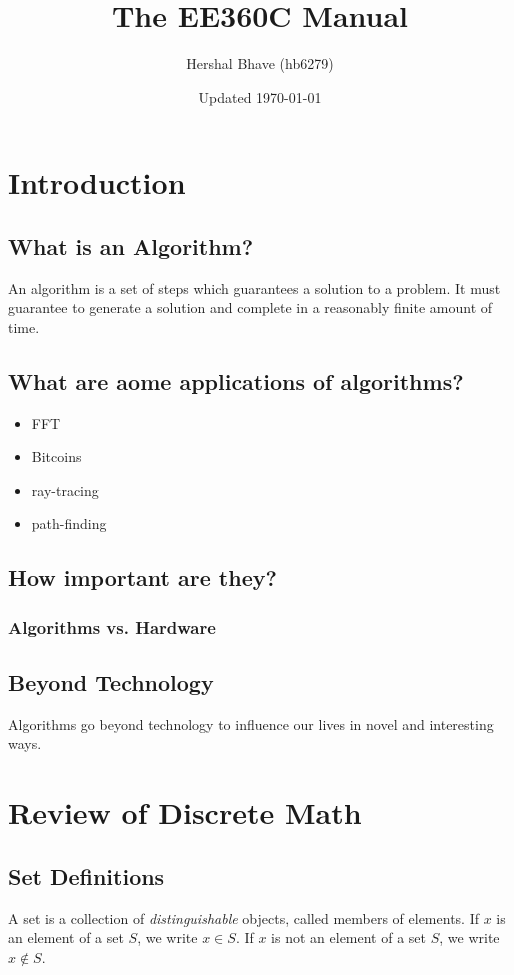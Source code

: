\documentclass[12pt]{book}
\title{The EE360C Manual}
\author{Hershal Bhave (hb6279)}
\date{Updated \today}
\begin{document}
\maketitle
\tableofcontents
\chapter{Introduction}
\section{What is an Algorithm?}
An algorithm is a set of steps which guarantees a solution to a
problem. It must guarantee to generate a solution and complete in a
reasonably finite amount of time.

\section{What are aome applications of algorithms?}
\begin{multicols}{4}
  \begin{itemize}
  \item FFT
  \item Bitcoins
  \item ray-tracing
  \item path-finding
  \end{itemize}
\end{multicols}
\section{How important are they?}
\subsection{Algorithms vs. Hardware}

\section{Beyond Technology}
Algorithms go beyond technology to influence our lives in novel and
interesting ways.

\chapter{Review of Discrete Math}
\section{Set Definitions}
A set is a collection of {\em distinguishable} objects, called members
of elements. If $x$ is an element of a set $S$, we write $x \in S$. If
$x$ is not an element of a set $S$, we write $x \not\in S$. 
\end{document}
